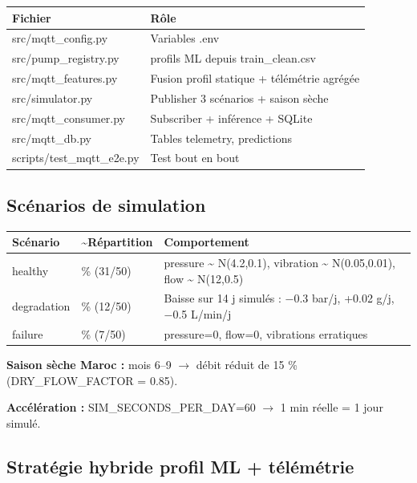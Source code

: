 \documentclass[11pt,a4paper]{report}
\begin{document}
{\small
\begin{longtable}{@{}>{\raggedright\arraybackslash}p{}>{\raggedright\arraybackslash}p{}@{}}
\toprule
\rowcolor{EHTPTableHead}Fichier & Rôle \\
\midrule
src/mqtt\_config.py & Variables .env \\
src/pump\_registry.py & 50 profils ML depuis train\_clean.csv \\
src/mqtt\_features.py & Fusion profil statique + télémétrie agrégée \\
src/simulator.py & Publisher 3 scénarios + saison sèche \\
src/mqtt\_consumer.py & Subscriber + inférence + SQLite \\
src/mqtt\_db.py & Tables telemetry, predictions \\
scripts/test\_mqtt\_e2e.py & Test bout en bout \\
\bottomrule
\end{longtable}
}

\subsection{Scénarios de simulation}

{\small
\begin{longtable}{@{}>{\raggedright\arraybackslash}p{}>{\raggedright\arraybackslash}p{}>{\raggedright\arraybackslash}p{}@{}}
\toprule
\rowcolor{EHTPTableHead}Scénario & \textasciitilde{}Répartition & Comportement \\
\midrule
healthy & 60 \% (31/50) & pressure \textasciitilde{} N(4.2,0.1), vibration \textasciitilde{} N(0.05,0.01), flow \textasciitilde{} N(12,0.5) \\
degradation & 25 \% (12/50) & Baisse sur 14 j simulés : −0.3 bar/j, +0.02 g/j, −0.5 L/min/j \\
failure & 15 \% (7/50) & pressure=0, flow=0, vibrations erratiques \\
\bottomrule
\end{longtable}
}

\textbf{Saison sèche Maroc :} mois 6–9 $\rightarrow$ débit réduit de 15 \% (DRY\_FLOW\_FACTOR = 0.85).

\textbf{Accélération :} SIM\_SECONDS\_PER\_DAY=60 $\rightarrow$ 1 min réelle = 1 jour simulé.

\subsection{Stratégie hybride profil ML + télémétrie}
\end{document}
